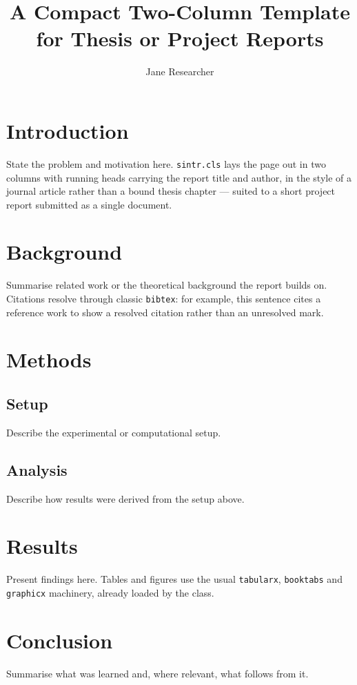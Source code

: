 \documentclass[english]{sintr}
\title{A Compact Two-Column Template for Thesis or Project Reports}
\author[1]{Jane Researcher}
\affil[1]{Department of Physics, Example Institute}
\begin{document}
\maketitle

\section{Introduction}
\label{sec:introduction}

State the problem and motivation here. \texttt{sintr.cls} lays the page out
in two columns with running heads carrying the report title and author, in
the style of a journal article rather than a bound thesis chapter — suited
to a short project report submitted as a single document.

\section{Background}
\label{sec:background}

Summarise related work or the theoretical background the report builds on.
Citations resolve through classic \texttt{bibtex}: for example, this
sentence cites a reference work \cite{knuth1984} to show a resolved
citation rather than an unresolved mark.

\section{Methods}
\label{sec:methods}

\subsection{Setup}

Describe the experimental or computational setup.

\subsection{Analysis}

Describe how results were derived from the setup above.

\section{Results}
\label{sec:results}

Present findings here. Tables and figures use the usual \texttt{tabularx},
\texttt{booktabs} and \texttt{graphicx} machinery, already loaded by the
class.

\section{Conclusion}
\label{sec:conclusion}

Summarise what was learned and, where relevant, what follows from it.



\end{document}
